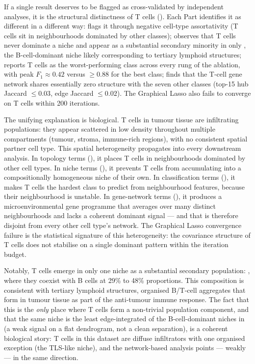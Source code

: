 If a single result deserves to be flagged as cross-validated by independent analyses, it is the structural distinctness of T cells (). Each Part identifies it as different in a different way:  flags it through negative cell-type assortativity (T cells sit in neighbourhoods dominated by other classes);  observes that T cells never dominate a niche and appear as a substantial secondary minority in only , the B-cell-dominant niche likely corresponding to tertiary lymphoid structures;  reports T cells as the worst-performing class across every rung of the ablation, with peak $F_1 \approx 0.42$ versus $\geq 0.88$ for the best class;  finds that the T-cell gene network shares essentially zero structure with the seven other classes (top-15 hub Jaccard $\leq 0.03$, edge Jaccard $\leq 0.02$). The Graphical Lasso also fails to converge on T cells within 200 iterations.

The unifying explanation is biological. T cells in tumour tissue are infiltrating populations: they appear scattered in low density throughout multiple compartments (tumour, stroma, immune-rich regions), with no consistent spatial partner cell type. This spatial heterogeneity propagates into every downstream analysis. In topology terms (), it places T cells in neighbourhoods dominated by other cell types. In niche terms (), it prevents T cells from accumulating into a compositionally homogeneous niche of their own. In classification terms (), it makes T cells the hardest class to predict from neighbourhood features, because their neighbourhood is unstable. In gene-network terms (), it produces a microenvironmental gene programme that averages over many distinct neighbourhoods and lacks a coherent dominant signal --- and that is therefore disjoint from every other cell type's network. The Graphical Lasso convergence failure is the statistical signature of this heterogeneity: the covariance structure of T cells does not stabilise on a single dominant pattern within the iteration budget.

Notably, T cells emerge in only one niche as a substantial secondary population: , where they coexist with B cells at 29\% to 48\% proportions. This composition is consistent with tertiary lymphoid structures, organised B/T-cell aggregates that form in tumour tissue as part of the anti-tumour immune response. The fact that this is the \emph{only} place where T cells form a non-trivial population component, and that the same niche is the least edge-integrated of the B-cell-dominant niches in  (a weak signal on a flat dendrogram, not a clean separation), is a coherent biological story: T cells in this dataset are diffuse infiltrators with one organised exception (the TLS-like niche), and the network-based analysis points --- weakly --- in the same direction.

